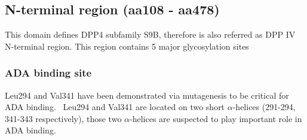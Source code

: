 \subsection{N-terminal region (aa108 - aa478)}

This domain defines DPP4 subfamily S9B, therefore is also referred as DPP IV N-terminal region. This region contains 5 major glycosylation sites 

\subsubsection{ADA binding site}
Leu294 and Val341 have been demonstrated via mutagenesis to be critical for ADA binding.~\cite{Abbott_1999} Leu294 and Val341 are located on two short $\alpha$-helices (291-294, 341-343 respectively), those two $\alpha$-helices are suspected to play important role in ADA binding. 